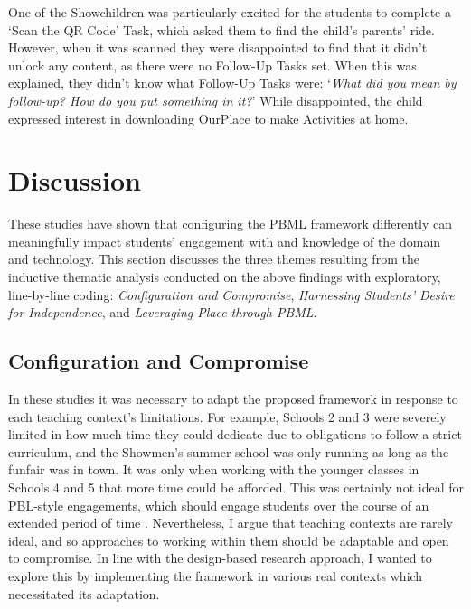 One of the Showchildren was particularly excited for the students to complete a `Scan the QR Code' Task, which asked them to find the child's parents' ride. However, when it was scanned they were disappointed to find that it didn't unlock any content, as there were no Follow-Up Tasks set. When this was explained, they didn't know what Follow-Up Tasks were: `\textit{What did you mean by follow-up? How do you put something in it?}' While disappointed, the child expressed interest in downloading OurPlace to make Activities at home.

\section{Discussion}
These studies have shown that configuring the PBML framework differently can meaningfully impact students' engagement with and knowledge of the domain and technology. This section discusses the three themes resulting from the inductive thematic analysis conducted on the above findings with exploratory, line-by-line coding: \textit{Configuration and Compromise}, \textit{Harnessing Students' Desire for Independence}, and \textit{Leveraging Place through PBML}. 

\subsection{Configuration and Compromise}
In these studies it was necessary to adapt the proposed framework in response to each teaching context's limitations. For example, Schools 2 and 3 were severely limited in how much time they could dedicate due to obligations to follow a strict curriculum, and the Showmen's summer school was only running as long as the funfair was in town. It was only when working with the younger classes in Schools 4 and 5 that more time could be afforded. This was certainly not ideal for PBL-style engagements, which should engage students over the course of an extended period of time \citep{Blumenfeld1991}. Nevertheless, I argue that teaching contexts are rarely ideal, and so approaches to working within them should be adaptable and open to compromise. In line with the design-based research approach, I wanted to explore this by implementing the framework in various real contexts which necessitated its adaptation.

